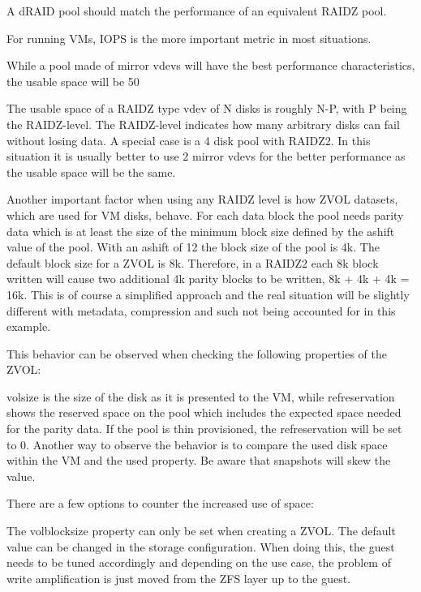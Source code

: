 A dRAID pool should match the performance of an equivalent RAIDZ pool.

For running VMs, IOPS is the more important metric in most situations.

While a pool made of mirror vdevs will have the best performance characteristics, the usable space will be 50%

The usable space of a RAIDZ type vdev of N disks is roughly N-P, with P being the RAIDZ-level. The RAIDZ-level indicates how many arbitrary disks can fail without losing data. A special case is a 4 disk pool with RAIDZ2. In this situation it is usually better to use 2 mirror vdevs for the better performance as the usable space will be the same.

Another important factor when using any RAIDZ level is how ZVOL datasets, which are used for VM disks, behave. For each data block the pool needs parity data which is at least the size of the minimum block size defined by the ashift value of the pool. With an ashift of 12 the block size of the pool is 4k. The default block size for a ZVOL is 8k. Therefore, in a RAIDZ2 each 8k block written will cause two additional 4k parity blocks to be written, 8k + 4k + 4k = 16k. This is of course a simplified approach and the real situation will be slightly different with metadata, compression and such not being accounted for in this example.

This behavior can be observed when checking the following properties of the ZVOL:

volsize is the size of the disk as it is presented to the VM, while refreservation shows the reserved space on the pool which includes the expected space needed for the parity data. If the pool is thin provisioned, the refreservation will be set to 0. Another way to observe the behavior is to compare the used disk space within the VM and the used property. Be aware that snapshots will skew the value.

There are a few options to counter the increased use of space:

The volblocksize property can only be set when creating a ZVOL. The default value can be changed in the storage configuration. When doing this, the guest needs to be tuned accordingly and depending on the use case, the problem of write amplification is just moved from the ZFS layer up to the guest.

